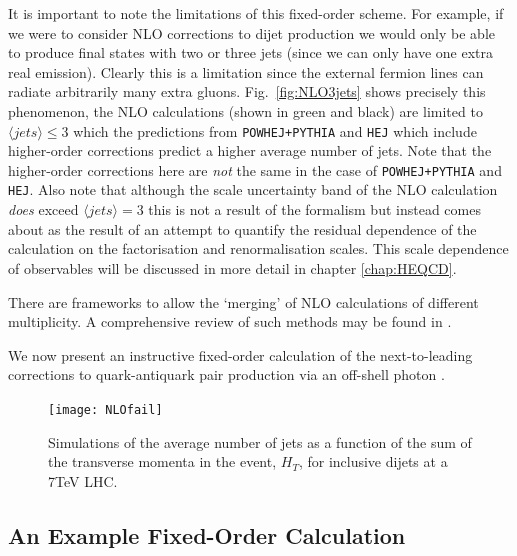 		It is important to note the limitations of this fixed-order scheme.  For example, if we were to consider
		NLO corrections to dijet production we would only be able to produce final states with two or three jets (since
		we can only have one extra real emission).  Clearly this is a limitation since the external fermion lines can
		radiate arbitrarily many extra gluons. Fig.~\eqref{fig:NLO3jets} shows precisely this phenomenon,
		the NLO calculations (shown in green and black) are limited to $\langle jets\rangle\leq3$ which the predictions
		from \texttt{POWHEJ+PYTHIA} and \texttt{HEJ} which include higher-order corrections predict a higher average
		number of jets.  Note that the higher-order corrections here are \emph{not} the same in the case of
		\texttt{POWHEJ+PYTHIA} and \texttt{HEJ}.  Also note that although the scale uncertainty band of the NLO
		calculation \emph{does} exceed $\langle jets\rangle=3$ this is not a result of the formalism but instead comes
		about as the result of an attempt to quantify the residual dependence of the calculation on the factorisation
		and renormalisation scales.  This scale dependence of observables will be discussed in more detail in chapter
		\ref{chap:HEQCD}.

		There are frameworks to allow the `merging' of NLO calculations of different multiplicity.  A comprehensive
		review of such methods may be found in \cite{Alwall:2007fs}.

		We now present an instructive fixed-order calculation of the next-to-leading corrections to quark-antiquark pair
		production via an off-shell photon \cite{fieldBook}.

		\begin{figure}[hbt]
			\centering
			\texttt{[image: NLOfail]}
			\caption{Simulations of the average number of jets as a function of the sum of the transverse momenta in the event, $H_T$,
			         for inclusive dijets at a 7TeV LHC.}
			\label{fig:NLO3jets}
  		\end{figure}

	\subsection{An Example Fixed-Order Calculation}
		\label{sub:eg1loop}

